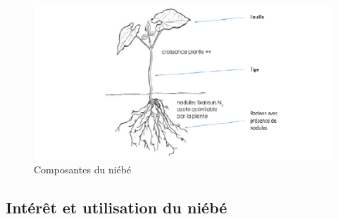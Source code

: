 \documentclass[a4paper,11pt]{article}
\begin{document}
\begin{figure}%
  \begin{center}
   \includegraphics[width=16cm]{images/SchemaDescriptifNiebe}
  \end{center}
\caption{Composantes du niébé}
\end{figure}


\subsection{Intérêt et utilisation du niébé}
\end{document}
